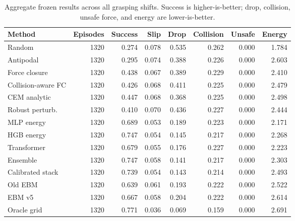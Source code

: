 \begin{table}[t]
\centering
\caption{Aggregate frozen results across all grasping shifts. Success is higher-is-better; drop, collision, unsafe force, and energy are lower-is-better.}
\label{tab:aggregate-main}
\scriptsize
\begin{tabular}{lrrrrrrr}
\toprule
Method & Episodes & Success & Slip & Drop & Collision & Unsafe & Energy \\
\midrule
Random & 1320 & 0.274 & 0.078 & 0.535 & 0.262 & 0.000 & 1.784 \\
Antipodal & 1320 & 0.295 & 0.074 & 0.388 & 0.226 & 0.000 & 2.603 \\
Force closure & 1320 & 0.438 & 0.067 & 0.389 & 0.229 & 0.000 & 2.410 \\
Collision-aware FC & 1320 & 0.426 & 0.068 & 0.411 & 0.225 & 0.000 & 2.479 \\
CEM analytic & 1320 & 0.447 & 0.068 & 0.368 & 0.225 & 0.000 & 2.498 \\
Robust perturb. & 1320 & 0.410 & 0.070 & 0.436 & 0.227 & 0.000 & 2.444 \\
MLP energy & 1320 & 0.689 & 0.053 & 0.189 & 0.223 & 0.000 & 2.171 \\
HGB energy & 1320 & 0.747 & 0.054 & 0.145 & 0.217 & 0.000 & 2.268 \\
Transformer & 1320 & 0.679 & 0.055 & 0.176 & 0.227 & 0.000 & 2.223 \\
Ensemble & 1320 & 0.747 & 0.058 & 0.141 & 0.217 & 0.000 & 2.303 \\
Calibrated stack & 1320 & 0.739 & 0.054 & 0.143 & 0.214 & 0.000 & 2.493 \\
Old EBM & 1320 & 0.639 & 0.061 & 0.193 & 0.222 & 0.000 & 2.522 \\
EBM v5 & 1320 & 0.667 & 0.058 & 0.204 & 0.222 & 0.000 & 2.614 \\
Oracle grid & 1320 & 0.771 & 0.036 & 0.069 & 0.159 & 0.000 & 2.691 \\
\bottomrule
\end{tabular}
\end{table}
